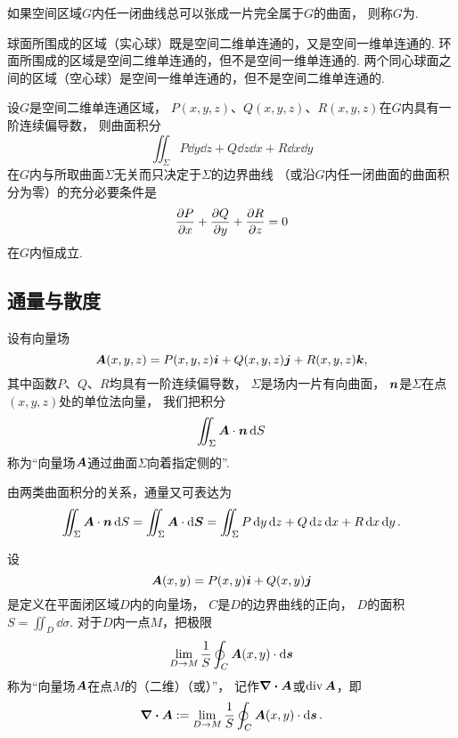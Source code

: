 \begin{definition}
如果空间区域\(G\)内任一闭曲线总可以张成一片完全属于\(G\)的曲面，
则称\(G\)为.
\end{definition}

\begin{example}
球面所围成的区域（实心球）既是空间二维单连通的，又是空间一维单连通的.
环面所围成的区域是空间二维单连通的，但不是空间一维单连通的.
两个同心球面之间的区域（空心球）是空间一维单连通的，但不是空间二维单连通的.
\end{example}

\begin{theorem}\label{theorem:线积分与面积分.沿任意闭曲面的曲面积分为零的条件}
设\(G\)是空间二维单连通区域，
\(P(x,y,z)\)、\(Q(x,y,z)\)、\(R(x,y,z)\)在\(G\)内具有一阶连续偏导数，
则曲面积分\[
	\iint_\Sigma P\dd{y}\dd{z}+Q\dd{z}\dd{x}+R\dd{x}\dd{y}
\]
在\(G\)内与所取曲面\(\Sigma\)无关而只决定于\(\Sigma\)的边界曲线
（或沿\(G\)内任一闭曲面的曲面积分为零）的充分必要条件是\[
	\pdv{P}{x}+\pdv{Q}{y}+\pdv{R}{z} = 0
\]在\(G\)内恒成立.
\end{theorem}

\subsection{通量与散度}
\begin{definition}
设有向量场\[
	\boldsymbol{A}(x,y,z)=P(x,y,z)\boldsymbol{i}+Q(x,y,z)\boldsymbol{j}+R(x,y,z)\boldsymbol{k},
\]
其中函数\(P\)、\(Q\)、\(R\)均具有一阶连续偏导数，
\(\Sigma\)是场内一片有向曲面，
\(\boldsymbol{n}\)是\(\Sigma\)在点\((x,y,z)\)处的单位法向量，
我们把积分\[
	\iint_\Sigma \boldsymbol{A}\cdot\boldsymbol{n}\dd{S}
\]称为“向量场\(\boldsymbol{A}\)通过曲面\(\Sigma\)向着指定侧的”.
\end{definition}
由两类曲面积分的关系，通量又可表达为\[
	\iint_\Sigma \boldsymbol{A}\cdot\boldsymbol{n}\dd{S}
	=\iint_\Sigma \boldsymbol{A}\cdot\dd{\boldsymbol{S}}
	=\iint_\Sigma P\dd{y}\dd{z}+Q\dd{z}\dd{x}+R\dd{x}\dd{y}.
\]

\begin{definition}[平面上的散度]
\def\defofdiv{\lim_{D \to M} \frac{1}{S} \oint_C \vb{A}(x,y) \cdot \dd{\vb{s}}}%
设\[
	\boldsymbol{A}(x,y)=P(x,y)\boldsymbol{i}+Q(x,y)\boldsymbol{j}
\]是定义在平面闭区域\(D\)内的向量场，
\(C\)是\(D\)的边界曲线的正向，
\(D\)的面积\(S = \iint_{D} \dd{\sigma}\).
对于\(D\)内一点\(M\)，把极限\[
	\defofdiv
\]称为“向量场\(\boldsymbol{A}\)在点\(M\)的（二维）（或）”，
记作\(\div{\boldsymbol{A}}\)或\(\operatorname{div}\boldsymbol{A}\)，即\[
	\div{\vb{A}} \defeq \defofdiv.
\]
\end{definition}

